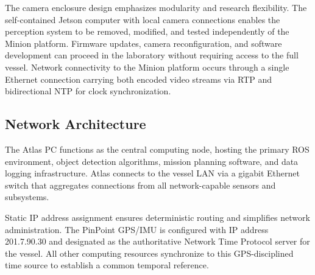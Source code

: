 \documentclass{erauthesis}
\begin{document}
The camera enclosure design emphasizes modularity and research flexibility. The self-contained Jetson computer with local camera connections enables the perception system to be removed, modified, and tested independently of the Minion platform. Firmware updates, camera reconfiguration, and software development can proceed in the laboratory without requiring access to the full vessel. Network connectivity to the Minion platform occurs through a single Ethernet connection carrying both encoded video streams via \ac{RTP} and bidirectional \ac{NTP} for clock synchronization.

\subsection{Network Architecture} \label{network_structure}


The Atlas PC functions as the central computing node, hosting the primary \ac{ROS} environment, object detection algorithms, mission planning software, and data logging infrastructure. Atlas connects to the vessel LAN via a gigabit Ethernet switch that aggregates connections from all network-capable sensors and subsystems.


Static IP address assignment ensures deterministic routing and simplifies network administration. The PinPoint \ac{GPS}/\ac{IMU} is configured with IP address 201.7.90.30 and designated as the authoritative Network Time Protocol server for the vessel. All other computing resources synchronize to this \ac{GPS}-disciplined time source to establish a common temporal reference.
\end{document}
